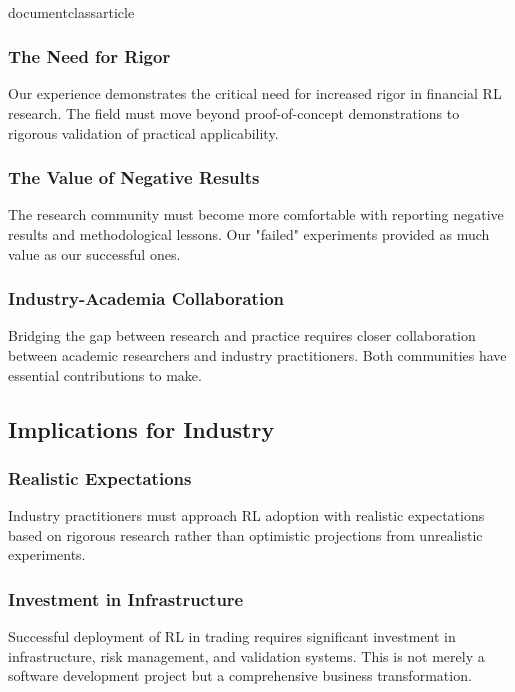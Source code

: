 \\documentclass{article}
\begin{document}
\subsubsection{The Need for Rigor}

Our experience demonstrates the critical need for increased rigor in financial RL research. The field must move beyond proof-of-concept demonstrations to rigorous validation of practical applicability.

\subsubsection{The Value of Negative Results}

The research community must become more comfortable with reporting negative results and methodological lessons. Our "failed" experiments provided as much value as our successful ones.

\subsubsection{Industry-Academia Collaboration}

Bridging the gap between research and practice requires closer collaboration between academic researchers and industry practitioners. Both communities have essential contributions to make.

\subsection{Implications for Industry}

\subsubsection{Realistic Expectations}

Industry practitioners must approach RL adoption with realistic expectations based on rigorous research rather than optimistic projections from unrealistic experiments.

\subsubsection{Investment in Infrastructure}

Successful deployment of RL in trading requires significant investment in infrastructure, risk management, and validation systems. This is not merely a software development project but a comprehensive business transformation.
\end{document}
